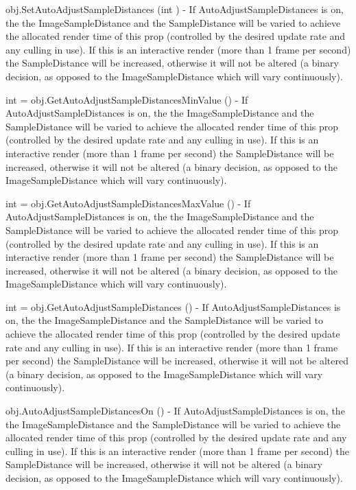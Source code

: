 \begin{DoxyItemize}
\item {\ttfamily obj.\-Set\-Auto\-Adjust\-Sample\-Distances (int )} -\/ If Auto\-Adjust\-Sample\-Distances is on, the the Image\-Sample\-Distance and the Sample\-Distance will be varied to achieve the allocated render time of this prop (controlled by the desired update rate and any culling in use). If this is an interactive render (more than 1 frame per second) the Sample\-Distance will be increased, otherwise it will not be altered (a binary decision, as opposed to the Image\-Sample\-Distance which will vary continuously).  
\item {\ttfamily int = obj.\-Get\-Auto\-Adjust\-Sample\-Distances\-Min\-Value ()} -\/ If Auto\-Adjust\-Sample\-Distances is on, the the Image\-Sample\-Distance and the Sample\-Distance will be varied to achieve the allocated render time of this prop (controlled by the desired update rate and any culling in use). If this is an interactive render (more than 1 frame per second) the Sample\-Distance will be increased, otherwise it will not be altered (a binary decision, as opposed to the Image\-Sample\-Distance which will vary continuously).  
\item {\ttfamily int = obj.\-Get\-Auto\-Adjust\-Sample\-Distances\-Max\-Value ()} -\/ If Auto\-Adjust\-Sample\-Distances is on, the the Image\-Sample\-Distance and the Sample\-Distance will be varied to achieve the allocated render time of this prop (controlled by the desired update rate and any culling in use). If this is an interactive render (more than 1 frame per second) the Sample\-Distance will be increased, otherwise it will not be altered (a binary decision, as opposed to the Image\-Sample\-Distance which will vary continuously).  
\item {\ttfamily int = obj.\-Get\-Auto\-Adjust\-Sample\-Distances ()} -\/ If Auto\-Adjust\-Sample\-Distances is on, the the Image\-Sample\-Distance and the Sample\-Distance will be varied to achieve the allocated render time of this prop (controlled by the desired update rate and any culling in use). If this is an interactive render (more than 1 frame per second) the Sample\-Distance will be increased, otherwise it will not be altered (a binary decision, as opposed to the Image\-Sample\-Distance which will vary continuously).  
\item {\ttfamily obj.\-Auto\-Adjust\-Sample\-Distances\-On ()} -\/ If Auto\-Adjust\-Sample\-Distances is on, the the Image\-Sample\-Distance and the Sample\-Distance will be varied to achieve the allocated render time of this prop (controlled by the desired update rate and any culling in use). If this is an interactive render (more than 1 frame per second) the Sample\-Distance will be increased, otherwise it will not be altered (a binary decision, as opposed to the Image\-Sample\-Distance which will vary continuously).  

\end{DoxyItemize}
